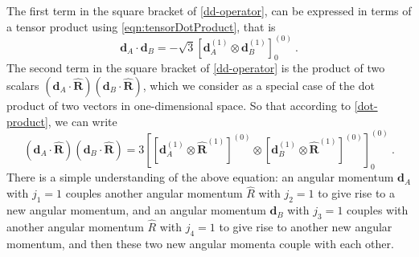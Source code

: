 The first term in the square bracket of \autoref{dd-operator}, can be expressed in terms of a tensor product using 
\autoref{eqn:tensorDotProduct}, that is
\begin{equation}
\mathbf{d}_{A}\cdot\mathbf{d}_{B} = - \sqrt{3} \left[ \mathbf{d}_{A}^{(1)} \otimes \mathbf{d}_{B}^{(1)} \right]_{0}^{(0)} \ . \label{dot-product}
\end{equation}
The second term in the square bracket of \autoref{dd-operator} is the product of two scalars $(\mathbf{d}_{A}\cdot\mathbf{\hat{R} })(\mathbf{d}_{B}\cdot\mathbf{\hat{R}})$, which we consider as a special case of the dot product of two vectors in one-dimensional space. So that according to \autoref{dot-product}, we can write
\begin{equation}
(\mathbf{d}_{A}\cdot\mathbf{\hat{R}})(\mathbf{d}_{B}\cdot \mathbf{\hat{R} })= 3\left[ \left[ \mathbf{d}_{A}^{(1)} \otimes \mathbf{\hat{R}}^{(1)} \right]^{(0)}\otimes \left[ \mathbf{d}_{B}^{(1)} \otimes \mathbf{\hat{R}}^{(1)} \right]^{(0)}  \right]_{0}^{(0)}  \ . \label{eqn:dRdR}
\end{equation}
There is a simple understanding of the above equation: an angular momentum $\mathbf{d}_{A}$ with $j_{1}=1$ 
couples  another angular momentum $\hat{R}$ with $j_{2}=1$ to give rise to a new angular momentum, and an 
angular momentum $\mathbf{d}_{B}$ with $j_{3}=1$ couples  with another angular momentum $\hat{R}$ with $j_{4}=1$ 
to give rise to another new angular momentum, and then these two new angular momenta couple with each other. 

